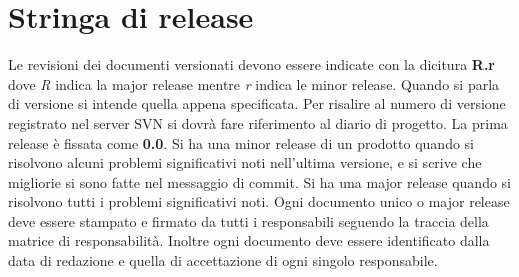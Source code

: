 \section{Stringa di release}
Le revisioni dei documenti versionati devono essere indicate con la dicitura \textbf{R.r} dove \emph{R} indica la major release mentre \emph{r} indica le minor release. Quando si parla di versione si intende quella appena specificata. Per risalire al numero di versione registrato nel server SVN si dovrà fare riferimento al diario di progetto.
La prima release è fissata come \textbf{0.0}.
Si ha una minor release di un prodotto quando si risolvono alcuni problemi significativi noti nell'ultima versione, e si scrive che migliorie si sono fatte nel messaggio di commit. Si ha una major release quando si risolvono tutti i problemi significativi noti.
Ogni documento unico o major release deve essere stampato e firmato da tutti i responsabili seguendo la traccia della matrice di responsabilità. Inoltre ogni documento deve essere identificato dalla data di redazione e quella di accettazione di ogni singolo responsabile. 
